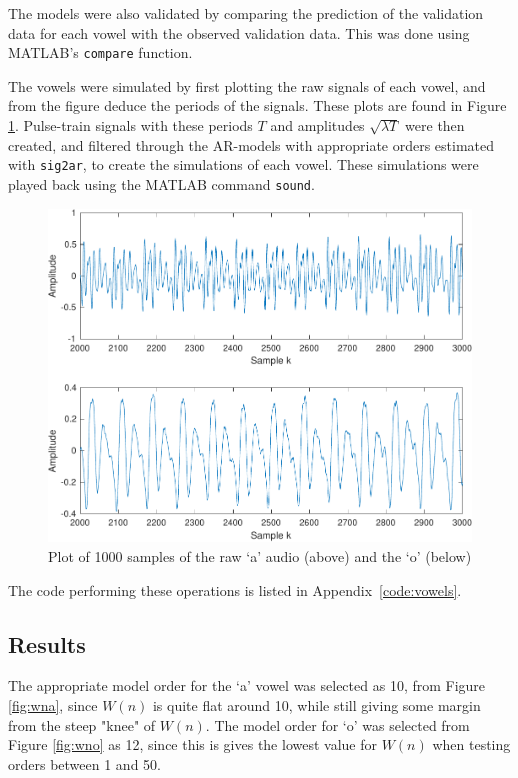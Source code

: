 \documentclass{IEEEtran}
\newcommand{\code}[1]{\texttt{#1}}
\begin{document}
The models were also validated by comparing the prediction of the validation
data for each vowel with the observed validation data. This was
done using MATLAB's \code{compare} function.

The vowels were simulated by first plotting the raw signals of each vowel, and
from the figure deduce the periods of the signals. These plots are found in
Figure \ref{fig:rawaudio}. Pulse-train signals with these
periods $T$ and amplitudes $\sqrt{\lambda T}$ were then created,
and filtered through the AR-models with appropriate
orders estimated with \code{sig2ar}, to create the simulations of each vowel.
These simulations were played back using the MATLAB command \code{sound}.

\begin{figure}[h!]
    \centering
    \captionsetup{justification=centering}
    \includegraphics[width=0.8\columnwidth]{pictures/raw_o_audio.pdf}
    \caption{Plot of 1000 samples of the raw `a' audio (above) and the `o'
    (below)}
    \label{fig:rawaudio}
\end{figure}

The code performing these operations is listed in Appendix~\ref{code:vowels}.

\subsection{Results}

The appropriate model order for the `a' vowel was selected as 10, from Figure
\ref{fig:wna}, since $W(n)$ is quite flat around 10, while still giving some
margin from the steep "knee" of $W(n)$. The model order for `o' was selected
from Figure \ref{fig:wno} as 12, since this is gives the lowest value for $W(n)$
when testing orders between 1 and 50.
\end{document}
